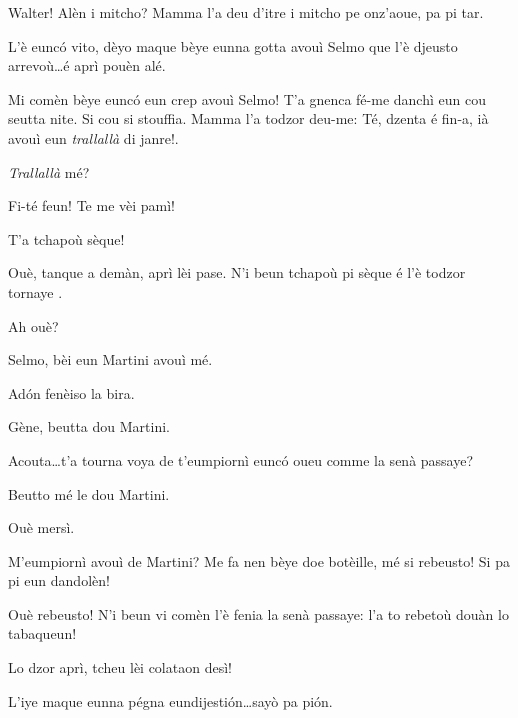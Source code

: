\begin{drama}

\Gemmaspeaks Walter! Alèn i mitcho? Mamma l'a deu d'itre i mitcho pe onz'aoue, pa pi tar.

\Walterspeaks	L'è eunc\'o vito, dèyo maque  bèye eunna gotta avouì Selmo que l'è djeusto arrevoù\ldots é aprì pouèn alé.

\Gemmaspeaks{} Mi comèn bèye eunc\'o eun crep avouì Selmo! T'a gnenca fé-me danchì eun cou seutta nite. Si cou si stouffia. Mamma l'a todzor deu-me: \og Té, dzenta é fin-a, ià avouì eun \textit{trallallà} di janre!\fg.

\Walterspeaks	\textit{Trallallà} mé?

\Gemmaspeaks Fi-té feun! Te me vèi pamì! 


\Selmospeaks{} T'a tchapoù sèque!

\Walterspeaks	Ouè, tanque a demàn, aprì lèi pase. N'i beun tchapoù pi sèque é l'è todzor tornaye	.

\Selmospeaks Ah ouè?

\Walterspeaks{} Selmo, bèi eun Martini avouì mé.

\Selmospeaks Ad\'on fenèiso la bira.

\Walterspeaks Gène, beutta dou Martini.

\Genespeaks Acouta\ldots t'a tourna voya de t'eumpiornì eunc\'o oueu comme la senà passaye?

\Dorinaspeaks Beutto mé le dou Martini.

\Genespeaks{} Ouè mersì.

\Walterspeaks	M'eumpiornì avouì de Martini? Me fa nen bèye doe botèille, mé si rebeusto! Si pa pi eun dandolèn!

\Genespeaks{} Ouè rebeusto! N'i beun vi comèn l'è fenia la senà passaye: l'a to rebetoù douàn lo tabaqueun!


\Genespeaks Lo dzor aprì, tcheu lèi colataon desì!

\Walterspeaks L'iye maque eunna pégna eundijesti\'on\ldots sayò pa pi\'on.



\end{drama}
